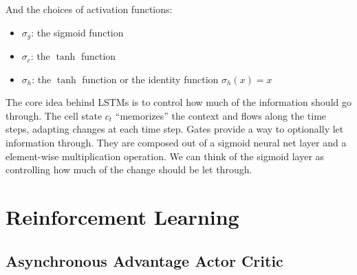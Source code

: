         And the choices of activation functions:

        \begin{itemize}
            \item $\sigma_g$: the sigmoid function
            \item $\sigma_c$: the $\tanh$ function
            \item $\sigma_h$: the $\tanh$ function or the identity function $\sigma_h(x) = x$
        \end{itemize}

        The core idea behind LSTMs is to control how much of the information should go through. \cite{Ola2015}
        The cell state $c_t$ ``memorizes'' the context and flows along the time steps,
        adapting changes at each time step.
        Gates provide a way to optionally let information through.
        They are composed out of a sigmoid neural net layer and a element-wise multiplication operation.
        We can think of the sigmoid layer as controlling how much of the change should be let through.

\section{Reinforcement Learning}

    \subsection{Asynchronous Advantage Actor Critic}
